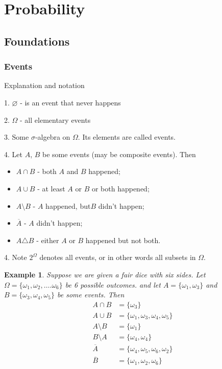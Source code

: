 \documentclass[10pt]{article}
\newtheorem*{example}{Example}
\begin{document}
\section{Probability}

\subsection{Foundations}

\subsubsection{Events}

Explanation and notation

1. $\varnothing$ - is an event that never happens

2. $\Omega$ - all elementary events

3. Some $\sigma$-algebra on $\Omega$. Its elements are called events.

4. Let $A$, $B$ be some events (may be composite events). Then 
\begin{itemize}
\item $A\cap B$ - both $A$ and $B$ happened;
\item $A\cup B$ - at least $A$ or $B$ or both happened;
\item $A\setminus B$ - $A$ happened, but$B$ didn't happen;
\item $\overline{A}$ -  $A$ didn't happen;
\item $A\triangle B$ - either $A$ or $B$ happened but not both.
\end{itemize}

4. Note $2^\Omega$ denotes all events, or in other words all subsets in $\Omega$.

\begin{example}

Suppose we are given a fair dice with six sides. Let $\Omega=\{\omega_1,\omega_2,\ldots.\omega_6\}$ be 6 possible outcomes. and let $A=\{\omega_1, \omega_3\}$ and $B=\{\omega_3,\omega_4,\omega_5\}$ be some events. Then
\begin{align}
A\cap B&=\{\omega_3\}\\
A\cup B&=\{\omega_1,\omega_3,\omega_4,\omega_5\}\\
A\setminus B&=\{\omega_1\}\\
B\setminus A&=\{\omega_4,\omega_4\}\\
\overline{A}&=\{\omega_4,\omega_5,\omega_6,\omega_2\}\\
\overline{B}&=\{\omega_1,\omega_2,\omega_6\}
\end{align} 
\end{example}
\end{document}
